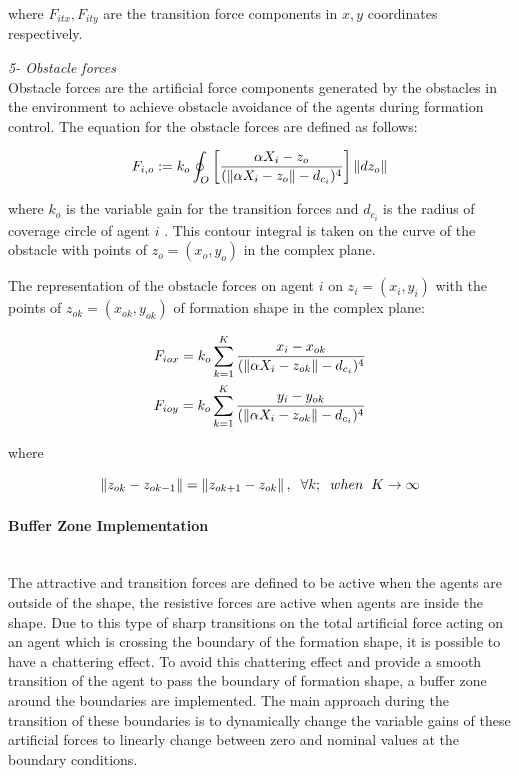 where  $F_{itx} , F_{ity} $ are the transition force components in $x,y$ coordinates respectively. \newline
			
\textit{			5- Obstacle forces} \\ 
Obstacle forces are the artificial force components generated by the obstacles in the environment to achieve obstacle avoidance of the agents during formation control. 	
The equation for the obstacle forces are defined as follows:	
			
\begin{equation}
F_{i,o} := k_o  \oint_O \left[\frac{\alpha X_i - z_o}{(\left\lVert\alpha X_i - z_o\right\rVert - d_{c_i})^4}\right] \left\lVert dz_o\right\rVert
\end{equation}
			
where $k_o$ is the variable gain for the transition forces and $d_{c_i}$ is the radius of coverage circle of agent $i$ . This contour integral is taken on the curve of the obstacle with  points of $z_o = (x_o,y_o)$ in the complex plane.
			
The representation of the obstacle forces on agent $i$ on $z_i = (x_i, y_i)$ with the points of  $z_{ok} = (x_{ok},y_{ok})$ of formation shape in the complex plane:
			
\begin{align*}
& F_{iox} = k_o   \sum_{k=1}^{K} \frac{x_i -x_{ok}}{(\left\lVert\alpha X_i - z_{ok}\right\rVert -d_{c_i})^4}\\
& F_{ioy} = k_o   \sum_{k=1}^{K} \frac{y_i - y_{ok}}{(\left\lVert\alpha X_i - z_{ok}\right\rVert -d_{c_i})^4}\\
\end{align*}
			
where

\begin{equation}
\left\lVert z_{ok}- z_{ok -1}\right\rVert = \left\lVert z_{ok+1} - z_{ok}\right\rVert, \hspace{0.2cm}  \forall k ;  \hspace{0.2cm} when  \hspace{0.2cm} K \to\infty
\end{equation}
			
\paragraph{Buffer Zone Implementation}\hspace{0pt} \\
The attractive and transition forces are defined to be active when the agents are outside of the shape, the resistive forces are active when agents are inside the shape. Due to this type of sharp transitions on the total artificial force acting on an agent which is crossing the boundary of the formation shape, it is possible to have a chattering effect. To avoid this chattering effect and provide a smooth transition of the agent to pass the boundary of formation shape, a buffer zone around the boundaries are implemented. The main approach during the transition of these boundaries is to dynamically change the variable gains of these artificial forces to linearly change between zero and nominal values at the boundary conditions. 
     

